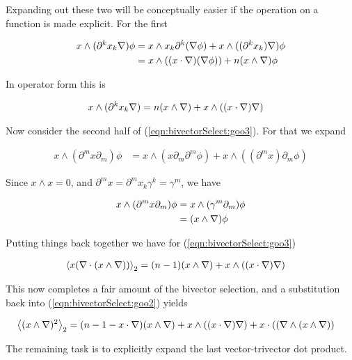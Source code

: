 Expanding out these two will be conceptually easier if the operation on a function is made explicit.  For the first

\begin{align*}
x \wedge (\partial^k x_k \nabla ) \phi
&=
x \wedge x_k \partial^k (\nabla \phi)
+x \wedge ((\partial^k x_k) \nabla) \phi \\
&=
x \wedge ((x \cdot \nabla) (\nabla \phi))
+ n (x \wedge \nabla) \phi
\end{align*}

In operator form this is

\begin{align}\label{eqn:bivectorSelect:goo4}
x \wedge (\partial^k x_k \nabla ) &= n (x \wedge \nabla) + x \wedge ((x \cdot \nabla) \nabla ) 
\end{align}

Now consider the second half of (\ref{eqn:bivectorSelect:goo3}).  For that we expand

\begin{align*}
x \wedge (\partial^m x \partial_m ) \phi
&=
x \wedge (x \partial_m \partial^m \phi)
+ x \wedge ((\partial^m x) \partial_m \phi)
\end{align*}

Since $x \wedge x = 0$, and $\partial^m x = \partial^m x_k \gamma^k = \gamma^m$, we have

\begin{align*}
x \wedge (\partial^m x \partial_m ) \phi
&=
x \wedge (\gamma^m \partial_m ) \phi \\
&=
(x \wedge \nabla) \phi
\end{align*}

Putting things back together we have for (\ref{eqn:bivectorSelect:goo3})


\begin{align}\label{eqn:bivectorSelect:goo5}
{\left\langle{{ x (\nabla\cdot (x \wedge \nabla)) }}\right\rangle}_{2} &= (n-1) (x \wedge \nabla) + x \wedge ((x \cdot \nabla) \nabla ) 
\end{align}

This now completes a fair amount of the bivector selection, and a substitution back into (\ref{eqn:bivectorSelect:goo2}) yields

\begin{align}
{\left\langle{{ (x \wedge \nabla)^2 }}\right\rangle}_{2}
&=
(n-1 - x \cdot \nabla) (x \wedge \nabla) + x \wedge ((x \cdot \nabla) \nabla ) 
+ x \cdot ((\nabla \wedge (x \wedge \nabla)) 
\end{align}

The remaining task is to explicitly expand the last vector-trivector dot product.

\EndNoBibArticle
